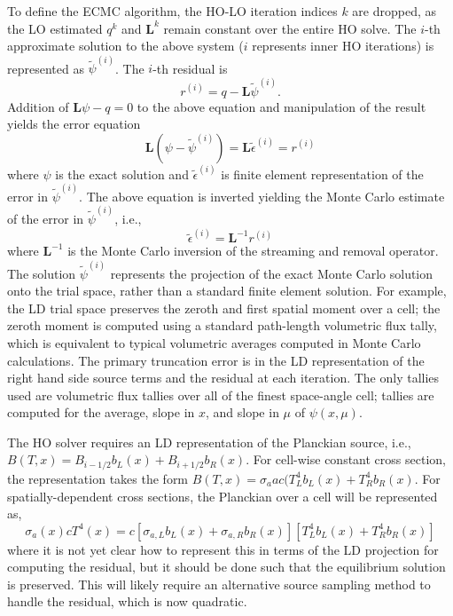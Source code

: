 \documentclass{mc2013}
\newcommand{\B}[1]{\ensuremath{\mathbf{#1}}}
\newcommand{\il}{{i-1/2}}
\newcommand{\ir}{{i+1/2}}
\begin{document}
To define the ECMC algorithm, the HO-LO iteration indices
$k$ are dropped, as the LO estimated $q^{k}$ and $\B L^{k}$ remain constant over the entire HO solve.
The $i$-th approximate solution to the above system ($i$ represents inner HO
iterations) is represented as
$\tilde{\psi}^{(i)}$.    
The $i$-th residual is 
\begin{equation}
r^{(i)} = q - \B L\tilde{\psi}^{(i)}.
\end{equation}
Addition of $\B L\psi - q=0$ to the above equation 
and manipulation of the result yields the error equation
\begin{equation}
\B L (\psi - \tilde{\psi}^{(i)}) = \B L \tilde{\epsilon}^{(i)} = r^{(i)}
\end{equation}
where $\psi$ is the exact solution and $\tilde{\epsilon}^{(i)}$ is finite element
representation of the error in
$\tilde{\psi}^{(i)}$. The above equation is inverted yielding the Monte Carlo
estimate of the error in $\tilde{\psi}^{(i)}$, i.e.,
\begin{equation}
\tilde{\epsilon}^{(i)} = \B L^{-1} r^{(i)}
\end{equation}
where $\B L^{-1}$ is the Monte Carlo inversion of the streaming and removal operator.
The solution $\tilde{\psi}^{(i)}$ represents the projection of the exact Monte Carlo
solution onto the trial space, rather than a standard finite element solution.
For example, the LD trial space preserves the zeroth and first spatial moment over a
cell; the zeroth moment is computed using a standard path-length volumetric flux tally, which
is equivalent to typical volumetric averages computed in Monte Carlo calculations.  The primary truncation error is in the LD
representation of the right hand side source terms and the residual at each
iteration.  The only tallies used are volumetric flux tallies over all of the finest space-angle
cell; tallies are computed for the average, slope in $x$, and slope in $\mu$ of
$\psi(x,\mu)$.

The HO solver requires an LD representation of the Planckian source, i.e.,
$B(T,x) = B_\il b_L(x) + B_\ir b_R(x)$.  For cell-wise constant cross section, the
representation takes the form $B(T,x) = \sigma_a a c (T_L^4 b_L(x) + T_R^4 b_R(x)$.
For spatially-dependent cross sections, the
Planckian over a cell will be represented as,
\begin{equation}
    \sigma_a(x) c T^4(x) = c\left[\sigma_{a,L}b_L(x) + \sigma_{a,R}b_R(x) \right]
    \left[T_L^4 b_L(x) + T_R^4b_R(x)\right]
\end{equation}
where it is not yet clear how to represent this in terms of the LD projection for
computing the residual, but it
should be done such that the equilibrium solution is preserved.  This will likely
require an alternative source sampling method to handle the residual, which is now
quadratic.
\end{document}
